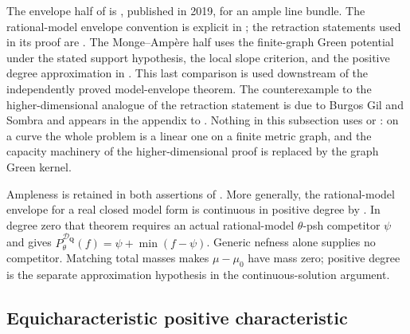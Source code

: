 \begin{remark}
\label{rem:ch29-curve-source}
The envelope half of  is
\cite[Theorem~1.1]{GJKM19}, published in 2019, for an ample line bundle.
The rational-model envelope convention is explicit in
; the retraction statements used in its proof are
\cite[Proposition~1.2 and Propositions~3.5, 3.8]{GJKM19}.  The
Monge--Amp\`ere half uses the finite-graph Green potential under the
stated support hypothesis, the local slope criterion, and the positive
degree approximation in
.  This last comparison is
used downstream of the independently proved model-envelope theorem.
The counterexample to the
higher-dimensional analogue of the retraction statement is due to Burgos Gil
and Sombra and appears in the appendix to \cite{GJKM19}.  Nothing in this
subsection uses  or : on a
curve the whole problem is a linear one on a finite metric graph, and the
capacity machinery of the higher-dimensional proof is replaced by the graph
Green kernel.
\end{remark}

\begin{remark}
\label{rem:ch29-curve-nef-ample}
Ampleness is retained in both assertions of
.  More generally, the
rational-model envelope for a real closed model form is continuous in
positive degree by .  In degree zero that
theorem requires an actual rational-model \(\theta\)-psh competitor
\(\psi\) and gives
\(P^{\mathcal D_{\mathbf Q}}_\theta(f)
  =\psi+\min(f-\psi)\).
Generic nefness alone supplies no competitor.  Matching total masses
makes \(\mu-\mu_0\) have mass zero; positive degree is the separate
approximation hypothesis in the continuous-solution argument.
\end{remark}

\subsection{Equicharacteristic positive characteristic}
\label{sec:ch29-later-positive}


